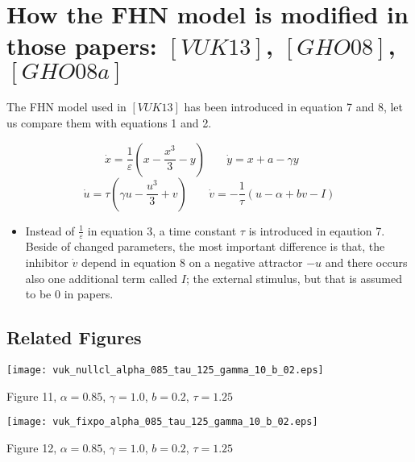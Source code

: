 \documentclass{article}
\begin{document}
\section{How the FHN model is modified in those papers: $[VUK13]$, $[GHO08]$, $[GHO08a]$}
The FHN model used in $[VUK13]$ has been introduced in equation 7 and 8, let us compare them with equations 1 and 2.

\begin{equation*}
 \dot{x} = \frac{1}{ \varepsilon}(x- \frac{x^3}{3}-y) \;\;\;\;\;\,\,\,  \dot{y}=x+a -\gamma y  \;\;\;\;\;   
\end{equation*}
\begin{equation*}
 \dot{u}=\tau(\gamma u  - \frac{u^3}{3}+v)
 \;\;\;\;\;\,\,\,
 \dot{v}=-\frac{1}{\tau}(u- \alpha +bv-I)
\end{equation*}


\begin{itemize}
 \item Instead of $\frac{1}{\varepsilon}$ in equation 3, a time constant $\tau$ is introduced in eqaution 7. Beside of changed parameters, the most important difference is that, the inhibitor $\dot{v}$ depend in equation 8 on a negative attractor $-u$ and there occurs also one additional term called $I$; the external stimulus, but that is assumed to be $0$ in papers.
\end{itemize}

\subsection{Related Figures}

\begin{center}
\texttt{[image: vuk\_nullcl\_alpha\_085\_tau\_125\_gamma\_10\_b\_02.eps]}
\end{center}
\begin{center}
 \begin{footnotesize}
 Figure 11, $\alpha=0.85$, $\gamma=1.0$, $b=0.2$, $\tau=1.25$
\end{footnotesize}
\end{center}

\begin{center}
\texttt{[image: vuk\_fixpo\_alpha\_085\_tau\_125\_gamma\_10\_b\_02.eps]}
\end{center}

\begin{center}
 \begin{footnotesize}
 Figure 12, $\alpha=0.85$, $\gamma=1.0$, $b=0.2$, $\tau=1.25$
\end{footnotesize}
\end{center}
\end{document}
